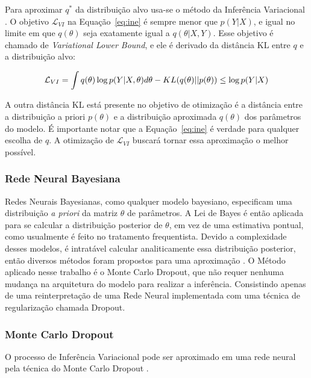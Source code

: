  Para aproximar $q^*$ da distribuição alvo usa-se o método da Inferência
Variacional \citep{bayesml}. O objetivo $\mathcal{L}_{VI}$ na
Equação~\ref{eq:ine} é sempre menor que $p(Y|X)$, e igual no limite em que
$q(\theta)$ seja exatamente igual a $q(\theta | X,Y)$. Esse objetivo é chamado de
\textit{Variational Lower Bound}, e ele é derivado da distância KL entre $q$ e
a distribuição alvo:

\begin{equation}
  \label {eq:ine}
  \mathcal{L}_{VI} = \int q(\theta) \log p(Y | X,\theta)d\theta - \mathnormal{KL}(q(\theta) ||p(\theta)) \\
                  \leq \log p(Y|X)
\end{equation}

A outra distância KL está presente no objetivo de otimização é a
distância entre a distribuição a priori $p(\theta)$ e a distribuição aproximada
$q(\theta)$ dos parâmetros do modelo. É importante notar que a Equação~\ref{eq:ine} é verdade para qualquer escolha de
$q$. A otimização de $\mathcal{L}_{VI}$ buscará tornar essa aproximação o melhor possível.


\subsubsection{Rede Neural Bayesiana}

Redes Neurais Bayesianas, como qualquer modelo bayesiano, especificam uma distribuição \textit{a priori} da matriz $\theta$ de parâmetros.
A Lei de Bayes é então aplicada para se calcular a distribuição posterior de
$\theta$, em vez de uma estimativa pontual, como usualmente é feito no tratamento frequentista.
Devido a complexidade desses modelos, é intratável calcular analiticamente essa distribuição posterior, então diversos métodos foram propostos para uma aproximação \citep{Gal2016Uncertainty}.
O Método aplicado nesse trabalho é o Monte Carlo Dropout, que não requer nenhuma mudança na arquitetura do modelo para realizar a inferência. Consistindo apenas de uma reinterpretação de uma Rede Neural implementada com uma técnica de regularização chamada Dropout. 

\subsubsection{Monte Carlo Dropout}

O processo de Inferência Variacional pode ser aproximado em uma rede neural pela técnica do Monte Carlo Dropout \citep{dropbayes}. \\

